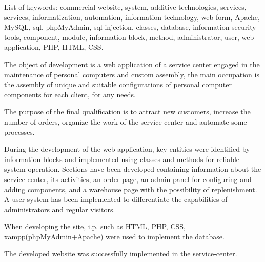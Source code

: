 List of keywords: commercial website, system, additive technologies, services, services, informatization, automation, information technology, web form, Apache, MySQL, sql, phpMyAdmin, sql injection, classes, database, information security tools, component, module, information block, method, administrator, user, web application, PHP, HTML, CSS.

The object of development is a web application of a service center engaged in the maintenance of personal computers and custom assembly, the main occupation is the assembly of unique and suitable configurations of personal computer components for each client, for any needs.

The purpose of the final qualification is to attract new customers, increase the number of orders, organize the work of the service center and automate some processes.

During the development of the web application, key entities were identified by information blocks and implemented using classes and methods for reliable system operation. Sections have been developed containing information about the service center, its activities, an order page, an admin panel for configuring and adding components, and a warehouse page with the possibility of replenishment. A user system has been implemented to differentiate the capabilities of administrators and regular visitors.

When developing the site, i.p. such as HTML, PHP, CSS, xampp(phpMyAdmin+Apache) were used to implement the database.

The developed website was successfully implemented in the service-center.
